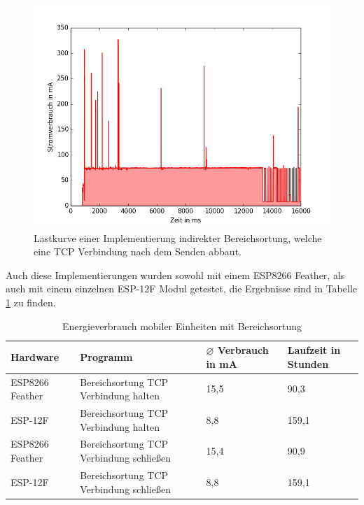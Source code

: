 \begin{figure}[h!]
  \centering
	\includegraphics[width=\textwidth]{plots/tcpdisco.png}
  \caption{Lastkurve einer Implementierung indirekter Bereichsortung, welche eine TCP Verbindung nach dem Senden abbaut.}
  \label{fig:tcpdisco}
\end{figure}

Auch diese Implementierungen wurden sowohl mit einem ESP8266 Feather, als auch mit einem einzelnen ESP-12F Modul getestet, die Ergebnisse sind in Tabelle \ref{table:associatonina} zu finden.

\begin{table}[h!]
	\centering
	\caption{Energieverbrauch mobiler Einheiten mit Bereichsortung}
	\label{table:associatonina}
	\begin{tabular}{p{3.5cm}|p{5cm}|p{2.5cm}|p{2.5cm}}
		Hardware & Programm & $\varnothing$ Verbrauch in mA & Laufzeit in Stunden\\
		\hline
		ESP8266 Feather & Bereichsortung TCP Verbindung halten & 15,5 & 90,3\\
		ESP-12F & Bereichsortung TCP Verbindung halten & 8,8 & 159,1\\
		ESP8266 Feather & Bereichsortung TCP Verbindung schließen & 15,4 & 90,9\\
		ESP-12F & Bereichsortung TCP Verbindung schließen & 8,8 & 159,1\\
	\end{tabular}
\end{table}

